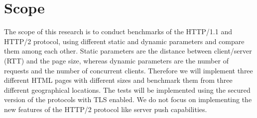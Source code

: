 \section{Scope}
\label{scope}
The scope of this research is to conduct benchmarks of the HTTP/1.1 and HTTP/2 protocol, using different static and dynamic parameters and compare them among each other. Static parameters are the distance between client/server (RTT) and the page size, whereas dynamic parameters are the number of requests and the number of concurrent clients. Therefore we will implement three different HTML pages with different sizes and benchmark them from three different geographical locations. The tests will be implemented using the secured version of the protocols with TLS enabled. We do not focus on implementing the new features of the HTTP/2 protocol like server push capabilities.  

